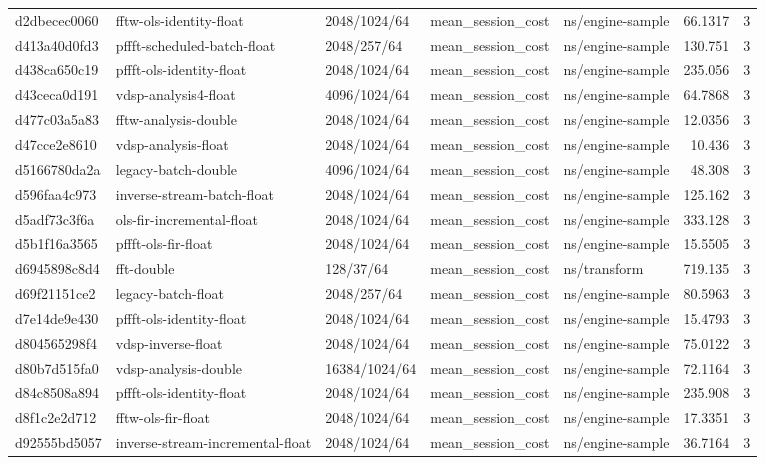 \begin{longtable}{lllllrr}
d2dbecec0060 & fftw-ols-identity-float & 2048/1024/64 & mean\_session\_cost & ns/engine-sample & 66.1317 & 3 \\
d413a40d0fd3 & pffft-scheduled-batch-float & 2048/257/64 & mean\_session\_cost & ns/engine-sample & 130.751 & 3 \\
d438ca650c19 & pffft-ols-identity-float & 2048/1024/64 & mean\_session\_cost & ns/engine-sample & 235.056 & 3 \\
d43ceca0d191 & vdsp-analysis4-float & 4096/1024/64 & mean\_session\_cost & ns/engine-sample & 64.7868 & 3 \\
d477c03a5a83 & fftw-analysis-double & 2048/1024/64 & mean\_session\_cost & ns/engine-sample & 12.0356 & 3 \\
d47cce2e8610 & vdsp-analysis-float & 2048/1024/64 & mean\_session\_cost & ns/engine-sample & 10.436 & 3 \\
d5166780da2a & legacy-batch-double & 4096/1024/64 & mean\_session\_cost & ns/engine-sample & 48.308 & 3 \\
d596faa4c973 & inverse-stream-batch-float & 2048/1024/64 & mean\_session\_cost & ns/engine-sample & 125.162 & 3 \\
d5adf73c3f6a & ols-fir-incremental-float & 2048/1024/64 & mean\_session\_cost & ns/engine-sample & 333.128 & 3 \\
d5b1f16a3565 & pffft-ols-fir-float & 2048/1024/64 & mean\_session\_cost & ns/engine-sample & 15.5505 & 3 \\
d6945898c8d4 & fft-double & 128/37/64 & mean\_session\_cost & ns/transform & 719.135 & 3 \\
d69f21151ce2 & legacy-batch-float & 2048/257/64 & mean\_session\_cost & ns/engine-sample & 80.5963 & 3 \\
d7e14de9e430 & pffft-ols-identity-float & 2048/1024/64 & mean\_session\_cost & ns/engine-sample & 15.4793 & 3 \\
d804565298f4 & vdsp-inverse-float & 2048/1024/64 & mean\_session\_cost & ns/engine-sample & 75.0122 & 3 \\
d80b7d515fa0 & vdsp-analysis-double & 16384/1024/64 & mean\_session\_cost & ns/engine-sample & 72.1164 & 3 \\
d84c8508a894 & pffft-ols-identity-float & 2048/1024/64 & mean\_session\_cost & ns/engine-sample & 235.908 & 3 \\
d8f1c2e2d712 & fftw-ols-fir-float & 2048/1024/64 & mean\_session\_cost & ns/engine-sample & 17.3351 & 3 \\
d92555bd5057 & inverse-stream-incremental-float & 2048/1024/64 & mean\_session\_cost & ns/engine-sample & 36.7164 & 3 \\

\end{longtable}
